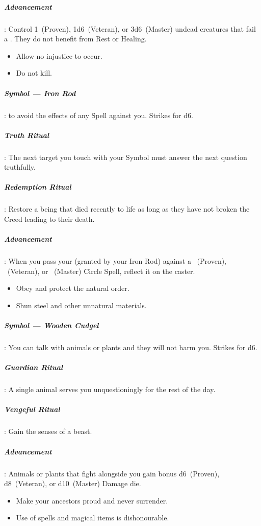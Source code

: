 \documentclass[itdr]{subfiles}
\begin{document}
\subparagraph{Advancement}: Control 1~(Proven), 1d6~(Veteran), or 3d6~(Master) undead creatures that fail a . They do not benefit from Rest or Healing.

\vfill

{\em\begin{itemize}
		\item Allow no injustice to occur.
		\item Do not kill.
\end{itemize}}

\subparagraph{Symbol --- Iron Rod}:  to avoid the effects of any Spell against you. Strikes for d6.

\subparagraph{Truth Ritual}: The next target you touch with your Symbol must answer the next question truthfully.

\subparagraph{Redemption Ritual}: Restore a being that died recently to life as long as they have not broken the Creed leading to their death.

\subparagraph{Advancement}: When you pass your  (granted by your Iron Rod) against a ~(Proven), ~(Veteran), or ~(Master) Circle Spell, reflect it on the caster.

\vfill
\break

{\em\begin{itemize}
		\item Obey and protect the natural order.
		\item Shun steel and other unnatural materials.
\end{itemize}}

\subparagraph{Symbol --- Wooden Cudgel}: You can talk with animals or plants and they will not harm you. Strikes for d6.

\subparagraph{Guardian Ritual}: A single animal serves you unquestioningly for the rest of the day.

\subparagraph{Vengeful Ritual}: Gain the senses of a beast.

\subparagraph{Advancement}: Animals or plants that fight alongside you gain bonus d6~(Proven), d8~(Veteran), or d10~(Master) Damage die.

\vfill

{\em\begin{itemize}
		\item Make your ancestors proud and never surrender.
		\item Use of spells and magical items is dishonourable.
\end{itemize}}
\end{document}
